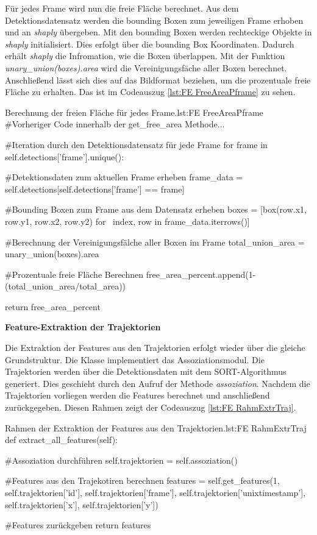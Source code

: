 Für jedes Frame wird nun die freie Fläche berechnet. Aus dem Detektionsdatensatz werden die bounding Boxen zum jeweiligen Frame erhoben und an \textit{shaply} übergeben. Mit den bounding Boxen werden rechteckige Objekte in \textit{shaply} initialisiert. Dies erfolgt über die bounding Box Koordinaten. Dadurch erhält \textit{shaply} die Infromation, wie die Boxen überlappen. Mit der Funktion \textit{unary\_union(boxes).area} wird die Vereinigungsfäche aller Boxen berechnet. Anschließend lässt sich dies auf das Bildformat beziehen, um die prozentuale freie Fläche zu erhalten. Das ist im Codeauszug \ref{lst:FE FreeAreaPframe} zu sehen. 

\begin{pythoncode}{Berechnung der freien Fläche für jedes Frame.}{lst:FE FreeAreaPframe}
#Vorheriger Code innerhalb der get_free_area Methode...

#Iteration durch den Detektionsdatensatz für jede Frame
for frame in self.detections['frame'].unique():

    #Detektionsdaten zum aktuellen Frame erheben
    frame_data = self.detections[self.detections['frame'] == frame]

    #Bounding Boxen zum Frame aus dem Datensatz erheben
    boxes = [box(row.x1, row.y1, row.x2, row.y2) for \ 
            index, row in frame_data.iterrows()]
   
    #Berechnung der Vereinigungsfälche aller Boxen im Frame
    total_union_area = unary_union(boxes).area

    #Prozentuale freie Fläche Berechnen 
    free_area_percent.append(1-(total_union_area/total_area))

return free_area_percent

\end{pythoncode}


\dubpar
\textbf{Feature-Extraktion der Trajektorien}\par

Die Extraktion der Features aus den Trajektorien erfolgt wieder über die gleiche Grundstruktur. Die Klasse implementiert das Assoziationsmodul. Die Trajektorien werden über die Detektionsdaten mit dem SORT-Algorithmus generiert. Dies geschieht durch den Aufruf der Methode \textit{assoziation}. Nachdem die Trajektorien vorliegen werden die Features berechnet und anschließend zurückgegeben. Diesen Rahmen zeigt der Codeauszug \ref{lst:FE RahmExtrTraj}. 

\begin{pythoncode}{Rahmen der Extraktion der Features aus den Trajektorien.}{lst:FE RahmExtrTraj}
def extract_all_features(self):
    
    #Assoziation durchführen
    self.trajektorien = self.assoziation()

    #Features aus den Trajekotiren berechnen
    features = self.get_features(1, self.trajektorien['id'], 
                                    self.trajektorien['frame'], 
                                    self.trajektorien['unixtimestamp'], 
                                    self.trajektorien['x'], 
                                    self.trajektorien['y'])
    
    #Features zurückgeben
    return features
\end{pythoncode}

